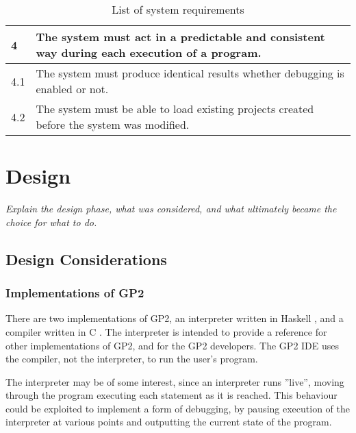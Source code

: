 \documentclass[authoryearcitations]{UoYCSproject}
\begin{document}
\begin{table}[tbp]
\begin{tabularx}{\linewidth}{|l|X|}
        4    &  The system must act in a predictable and consistent way during
                each execution of a program. \\ \hline
        4.1  &  The system must produce identical results whether debugging is
                enabled or not. \\ \hline
        4.2  &  The system must be able to load existing projects created before
                the system was modified. \\ \hline
    
    \end{tabularx}
    \caption{List of system requirements}
    \label{tab:SystemRequirements}
\end{table}

\clearpage


\chapter{Design}
\label{cha:Design}

\emph{Explain the design phase, what was considered, and what ultimately 
became the choice for what to do.}


\section{Design Considerations}

\subsection{Implementations of GP2}
\label{sec:ImplementationsOfGP2}

There are two implementations of GP2, an interpreter written in Haskell
\citep[ch. 5.3]{bak2015}, and a compiler written in C \citep[ch. 5.5]{bak2015}.
The interpreter is intended to provide a reference for other implementations of
GP2, and for the GP2 developers. The GP2 IDE uses the compiler, not the
interpreter, to run the user's program.

The interpreter may be of some interest, since an interpreter runs ''live'',
moving through the program executing each statement as it is reached. This
behaviour could be exploited to implement a form of debugging, by pausing
execution of the interpreter at various points and outputting the current state
of the program.
\end{document}
